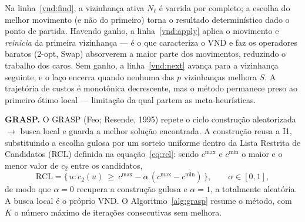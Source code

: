 \documentclass[10pt,a4paper]{article}
\begin{document}
\begin{algorithm}[H]
\caption{\textsc{VND} --- Descida em Vizinhança Variável}\label{alg:vnd}
\begin{algorithmic}[1]
\label{vnd:init}
  \label{vnd:find}
    \label{vnd:apply}
  \ELSE
    \label{vnd:next}
  \ENDIF
\ENDWHILE
{}
\end{algorithmic}
\end{algorithm}

Na linha~\ref{vnd:find}, a vizinhança ativa $N_{\ell}$ é varrida por completo; a escolha do melhor movimento (e não do primeiro) torna o resultado determinístico dado o ponto de partida. Havendo ganho, a linha~\ref{vnd:apply} aplica o movimento e \emph{reinicia} da primeira vizinhança --- é o que caracteriza o VND e faz os operadores baratos (2-opt, Swap) absorverem a maior parte dos movimentos, reduzindo o trabalho dos caros. Sem ganho, a linha~\ref{vnd:next} avança para a vizinhança seguinte, e o laço encerra quando nenhuma das $p$ vizinhanças melhora $S$. A trajetória de custos é monotônica decrescente, mas o método permanece preso ao primeiro ótimo local --- limitação da qual partem as meta-heurísticas.

\vspace{\baselineskip}
\textbf{GRASP.} O GRASP (Feo; Resende, 1995) repete o ciclo construção aleatorizada $\rightarrow$ busca local e guarda a melhor solução encontrada. A construção reusa a I1, substituindo a escolha gulosa por um sorteio uniforme dentro da Lista Restrita de Candidatos (RCL) definida na equação~\eqref{eq:rcl}: sendo $c^{\max}$ e $c^{\min}$ o maior e o menor valor de $c_2$ entre os candidatos,
\begin{equation}
\mathrm{RCL}=\{\,u : c_2(u)\ \ge\ c^{\max}-\alpha\,(c^{\max}-c^{\min})\,\},\qquad \alpha\in[0,1],
\label{eq:rcl}
\end{equation}
de modo que $\alpha=0$ recupera a construção gulosa e $\alpha=1$, a totalmente aleatória. A busca local é o próprio VND. O Algoritmo~\ref{alg:grasp} resume o método, com $K$ o número máximo de iterações consecutivas sem melhora.

\begin{algorithm}[H]
\caption{\textsc{GRASP}}\label{alg:grasp}
\begin{algorithmic}[1]
\label{g:init}
  \label{g:build}
  \label{g:ls}
    \label{g:improve}
  \ELSE
    \label{g:noimprove}
  \ENDIF
\ENDWHILE
{}
\end{algorithmic}
\end{algorithm}
\end{document}
